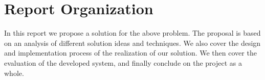 




\section{Report Organization}
In this report we propose a solution for the above problem. The proposal is based on an analysis of different solution ideas and techniques. We also cover the design and implementation process of the realization of our solution. We then cover the evaluation of the developed system, and finally conclude on the project as a whole. 

